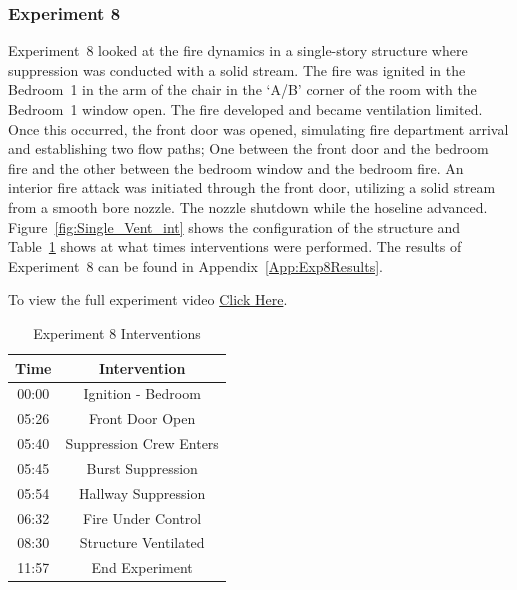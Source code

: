 \documentclass[12pt,oneside]{book}
\begin{document}
\subsubsection{Experiment 8}
Experiment~8 looked at the fire dynamics in a single-story structure where suppression was conducted with a solid stream. The fire was ignited in the Bedroom~1 in the arm of the chair in the `A/B' corner of the room with the Bedroom~1 window open. The fire developed and became ventilation limited. Once this occurred, the front door was opened, simulating fire department arrival and establishing two flow paths; One between the front door and the bedroom fire and the other between the bedroom window and the bedroom fire. An interior fire attack was initiated through the front door, utilizing a solid stream from a smooth bore nozzle. The nozzle shutdown while the hoseline advanced. Figure~\ref{fig:Single_Vent_int} shows the configuration of the structure and Table~\ref{Table:Exp8Interventions} shows at what times interventions were performed. The results of Experiment~8 can be found in Appendix~\ref{App:Exp8Results}. 

To view the full experiment video \href{https://player.vimeo.com/video/170499608?autoplay=1}{Click Here}.

\begin{table}[H]
	\centering
	\caption{Experiment 8 Interventions}
	\begin{tabular}{|c|c|} 
		\hline
		Time & Intervention \\ \hline \hline
		00:00 & Ignition - Bedroom \\ \hline
		05:26 & Front Door Open \\ \hline
		05:40 & Suppression Crew Enters\\ \hline
		05:45 & Burst Suppression \\ \hline 
		05:54 & Hallway Suppression \\ \hline
		06:32 & Fire Under Control 	\\ \hline
		08:30 & Structure Ventilated \\ \hline
		11:57 & End Experiment\\ \hline
	\end{tabular}
	\label{Table:Exp8Interventions}
\end{table}

\FloatBarrier
\clearpage
\end{document}
